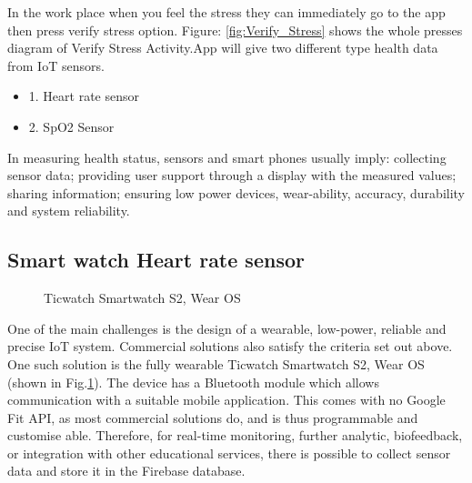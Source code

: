 In the work place when you feel the stress they can immediately go to the app then press verify stress option. Figure: \ref{fig:Verify_Stress} shows the whole presses diagram of Verify Stress Activity.App will give two different type health data from \acs{IoT} sensors.

\begin{itemize}
    \item 1. Heart rate sensor
    \item 2. \acf{SpO2} Sensor
\end{itemize}

In measuring health status, sensors and smart phones usually imply: collecting sensor data; providing user support through a display with the measured values; sharing information; ensuring low power devices, wear-ability, accuracy, durability and system reliability.

\subsection{Smart watch Heart rate sensor}
\begin{figure}[hbt!] 
  \centering
  \qquad
  \caption[Ticwatch Smartwatch S2, Wear OS ]{Ticwatch Smartwatch S2, Wear OS}
  \label{fig:Ticwatch}
\end{figure}
One of the main challenges is the design of a wearable, low-power, reliable and precise \acs{IoT} system. Commercial solutions also satisfy the criteria set out above.  One such solution is the fully wearable Ticwatch Smartwatch S2, Wear OS (shown in Fig.\ref{fig:Ticwatch}). The device has a Bluetooth module which allows communication with a suitable mobile application. This comes with no Google Fit API, as most commercial solutions do, and is thus programmable and customise able. Therefore, for real-time monitoring, further analytic, biofeedback, or integration with other educational services, there is possible to collect sensor data and store it in the Firebase database.

